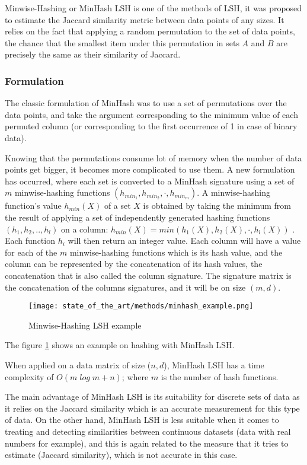 Minwise-Hashing or MinHash LSH is one of the methods of LSH, it was proposed to
estimate the Jaccard similarity metric  between data points of any sizes. It
relies on the fact that applying a random permutation to the set of data points,
the chance that the smallest item under this permutation in sets $A$ and $B$ are
precisely the same as their similarity of Jaccard. \citep{yu_yun_2022}

\subsubsection{Formulation}
The classic formulation of MinHash was to use a set of permutations over the
data points, and take the argument corresponding to the minimum value of each
permuted column (or corresponding to the first occurrence of 1 in case of binary
data).

Knowing that the permutations consume lot of memory when the number of data
points get bigger, it becomes more complicated to use them. A new formulation
has occurred, where each set is converted to a MinHash signature using a set of
$m$ minwise-hashing functions $(h_{min_1}, h_{min_2}, \cdot, h_{min_m})$. A
minwise-hashing function's value $h_{min}(X)$ of a set $X$ is obtained by taking
the minimum from the result of applying a set of independently generated hashing
functions $(h_1,h_2, .., h_l)$ on a column: $h_{min}(X) = min(h_1(X), h_2(X),
    \cdot, h_l(X))$ \citep{zhu_lshensemble_2016}. Each function $h_i$ will then
return an integer value. Each column will have a value for each of the $m$
minwise-hashing functions which is its hash value, and the column can be
represented by the concatenation of its hash values, the concatenation that is
also called the column signature. The signature matrix is the concatenation of
the columns signatures, and it will be on size $(m,d)$.

\begin{figure}[h]
    \centering
    \texttt{[image: state\_of\_the\_art/methods/minhash\_example.png]}
    \caption{Minwise-Hashing LSH example}
    \label{fig:minhashing_example}
\end{figure}

The figure \ref{fig:minhashing_example} shows an example on hashing with MinHash LSH.

When applied on a data matrix of size ($n, d$), MinHash LSH has a time
complexity of $O(m \; log\;m + n)$; where $m$ is the number of hash functions.
\citep{ertl_2020}

The main advantage of MinHash LSH is its suitability for discrete sets of data
as it relies on the Jaccard similarity which is an accurate measurement for this
type of data. On the other hand, MinHash LSH is less suitable when it comes to
treating and detecting similarities between continuous datasets (data with real
numbers for example), and this is again related to the measure that it tries to
estimate (Jaccard similarity), which is not accurate in this case.
